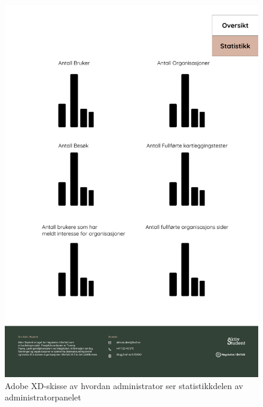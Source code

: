 \begin{figure}[H]
\centering
\includegraphics[width=.9\textwidth]{Illustrasjoner/Skisser-pdf/3.0/3-20-admin-statistikk.pdf}
\caption{Adobe XD-skisse av hvordan administrator ser statistikkdelen av administratorpanelet}
\label{vedlegg:3-20-admin-stats}
\end{figure}


